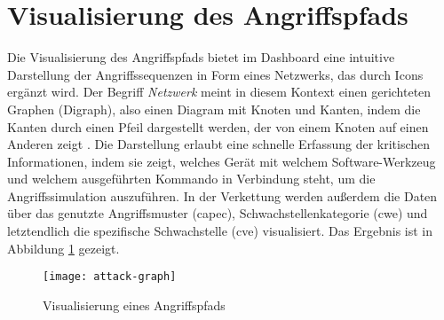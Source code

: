 \section{Visualisierung des Angriffspfads}
\label{sec:impl-visualisierungDesAngriffspfads}
Die Visualisierung des Angriffspfads bietet im Dashboard eine intuitive Darstellung der Angriffssequenzen in Form eines Netzwerks, das durch Icons ergänzt wird. Der Begriff \textit{Netzwerk} meint in diesem Kontext einen gerichteten Graphen (Digraph), also einen Diagram mit Knoten und Kanten, indem die Kanten durch einen Pfeil dargestellt werden, der von einem Knoten auf einen Anderen zeigt \autocite{DigraphDefinition}. Die Darstellung erlaubt eine schnelle Erfassung der kritischen Informationen, indem sie zeigt, welches Gerät mit welchem Software-Werkzeug und welchem ausgeführten Kommando in Verbindung steht, um die Angriffssimulation auszuführen. In der Verkettung werden außerdem die Daten über das genutzte Angriffsmuster (\gls{capec}), Schwachstellenkategorie (\gls{cwe}) und letztendlich die spezifische Schwachstelle (\gls{cve}) visualisiert. Das Ergebnis ist in Abbildung \ref{fig:attack-graph} gezeigt.
\begin{figure}
    \centering
    \texttt{[image: attack-graph]}
    \caption{Visualisierung eines Angriffspfads}
    \label{fig:attack-graph}
\end{figure}

